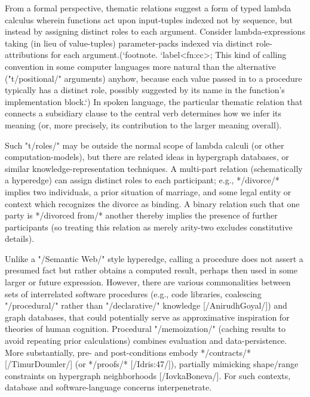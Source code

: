 From a formal perspective, thematic relations suggest a 
form of typed lambda calculus wherein functions act upon  
input-tuples indexed not by sequence, but instead by 
assigning distinct roles to each argument.  
Consider lambda-expressions taking (in lieu of 
value-tuples) parameter-packs indexed via 
distinct role-attributions for each argument.(`footnote.
`label<fn:cc>; This kind of calling convention 
in some computer languages %
more natural than the alternative ("t/positional/" 
arguments) anyhow, because each value passed in to a procedure 
typically has a distinct role, possibly suggested by its 
name in the function's implementation 
block.`)  In spoken language, the particular 
thematic relation that connects a subsidiary clause to the 
central verb determines how we infer its meaning 
(or, more precisely, its contribution to the larger meaning overall).  

Such "t/roles/" may be outside the normal  
scope of lambda calculi (or other computation-models), but there are 
related ideas in  
hypergraph databases, or similar knowledge-representation techniques.  
A multi-part relation (schematically a hyperedge) can assign distinct roles 
to each participant; e.g., */divorce/* implies two individuals, 
a prior situation of marriage, and some legal entity or 
context which recognizes the divorce as binding.  
A binary relation such that one party is */divorced from/* 
another thereby implies the presence of further participants 
(so treating this relation as merely arity-two excludes constitutive 
details).  

Unlike a "/Semantic Web/" style hyperedge, calling a procedure 
does not assert a presumed fact but rather obtains a computed 
result, perhaps then used in some larger or future expression.  
However, there are various commonalities between sets of interrelated 
software procedures (e.g., code libraries, coalescing "/procedural/" 
rather than "/declarative/" knowledge [/AnirudhGoyal/]) and graph databases, 
that could potentially serve as approximative inspiration for theories 
of human cognition.  Procedural "/memoization/" (caching results to 
avoid repeating prior calculations) combines evaluation and  
data-persistence.  More substantially, pre- and post-conditions 
embody */contracts/* [/TimurDoumler/] 
(or */proofs/* [/Idris:47/]), partially 
mimicking shape/range constraints on hypergraph 
neighborhoods [/IovkaBoneva/].  For such contexts, database and 
software-language concerns interpenetrate.  

